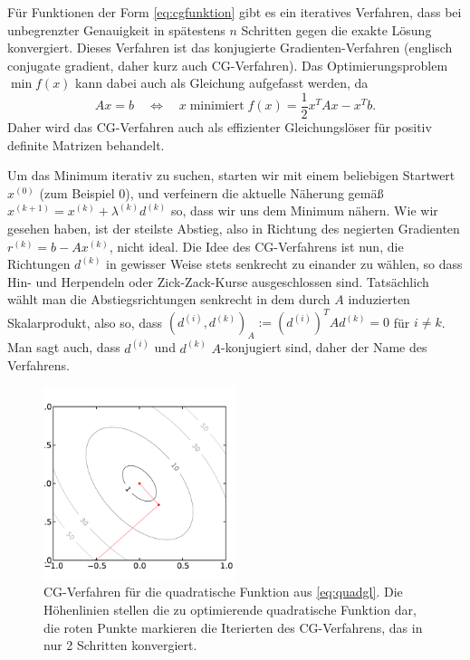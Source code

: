 Für Funktionen der Form \eqref{eq:cgfunktion} gibt es ein iteratives
Verfahren, dass bei unbegrenzter Genauigkeit in spätestens $n$
Schritten gegen die exakte Lösung konvergiert. Dieses Verfahren ist
das konjugierte Gradienten-Verfahren (englisch conjugate gradient,
daher kurz auch CG-Verfahren).
Das Optimierungsproblem $\min f(x)$ kann dabei auch als Gleichung
aufgefasst werden, da
\begin{equation}
  Ax = b \quad\iff\quad x\;\text{minimiert}\;f(x) = \frac{1}{2}x^TAx - x^Tb.
\end{equation}
Daher wird das CG-Verfahren auch als effizienter
Gleichungslöser für positiv definite Matrizen behandelt.

Um das Minimum iterativ zu suchen, starten wir mit einem beliebigen
Startwert $x^{(0)}$ (zum Beispiel 0), und verfeinern die aktuelle
Näherung gemäß $x^{(k+1)} = x^{(k)} + \lambda^{(k)}d^{(k)}$ so, dass
wir uns dem Minimum nähern. Wie wir gesehen haben, ist der steilste
Abstieg, also in Richtung des negierten Gradienten $r^{(k)} =
b-Ax^{(k)}$, nicht ideal. Die Idee des CG-Verfahrens ist nun, die
Richtungen $d^{(k)}$ in gewisser Weise stets senkrecht zu einander zu
wählen, so dass Hin- und Herpendeln oder Zick-Zack-Kurse
ausgeschlossen sind. Tatsächlich wählt man die Abstiegsrichtungen
senkrecht in dem durch $A$ induzierten Skalarprodukt, also so, dass
$(d^{(i)}, d^{(k)})_A := \left(d^{(i)}\right)^TAd^{(k)}=0$ für $i\neq
k$. Man sagt auch, dass $d^{(i)}$ und $d^{(k)}$ $A$-konjugiert sind,
daher der Name des Verfahrens.

\begin{figure}
  \centering
  \includegraphics[width=0.5\textwidth]{plots/cg}
  \caption{CG-Verfahren für die quadratische Funktion aus
    \eqref{eq:quadgl}. Die Höhenlinien stellen die zu optimierende
    quadratische Funktion dar, die roten Punkte markieren die
    Iterierten des CG-Verfahrens, das in nur 2 Schritten konvergiert.}
  \label{fig:cg}
\end{figure}


